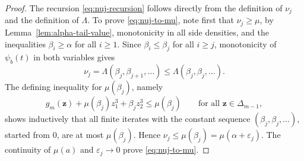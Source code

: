 \documentclass[10pt]{article}
\numberwithin{equation}{section}
\newcommand{\eps}{\varepsilon}
\begin{document}
\begin{proof}
The recursion \eqref{eq:nuj-recursion} follows directly from the definition of $\nu_j$ and the definition of $\Lambda$. To prove \eqref{eq:nuj-to-mu}, note first that $\nu_j\ge \mu$, by Lemma~\ref{lem:alpha-tail-value}, monotonicity in all side densities, and the inequalities $\beta_i \ge \alpha$ for all $i\ge1$. Since $\beta_i\le \beta_j$ for all $i\ge j$, monotonicity of $\psi_b(t)$ in both variables gives
\[
        \nu_j=\Lambda(\beta_j,\beta_{j+1},\ldots) \le \Lambda(\beta_j,\beta_j, \ldots).
\]
The defining inequality for $\mu(\beta_j)$, namely
\[
        g_m(\mathbf{z})+\mu(\beta_j)z_1^3+\beta_jz_2^3\le \mu(\beta_j) \qquad\text{for all } \mathbf{z}\in\Delta_{m-1},
\]
shows inductively that all finite iterates with the constant sequence $(\beta_j,\beta_j,\ldots)$, started from $0$, are at most $\mu(\beta_j)$. Hence $\nu_j\le \mu(\beta_j)=\mu(\alpha+\eps_j)$. The continuity of $\mu(a)$ and $\eps_j\to 0$ prove \eqref{eq:nuj-to-mu}.


\end{proof}
\end{document}
